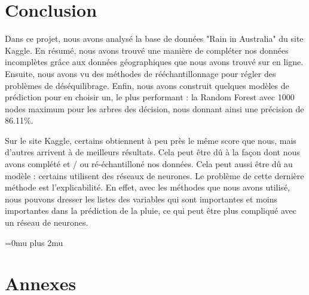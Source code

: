 \documentclass{article}
\begin{document}
\newpage
\part{Conclusion}

Dans ce projet, nous avons analysé la base de données "Rain in Australia" du site Kaggle. En résumé, nous avons trouvé une manière de compléter nos données incomplètes grâce aux données géographiques que nous avons trouvé sur en ligne. Ensuite, nous avons vu des méthodes de rééchantillonnage pour régler des problèmes de déséquilibrage. Enfin, nous avons construit quelques modèles de prédiction pour en choisir un, le plus performant : la Random Forest avec 1000 nodes maximum pour les arbres des décision, nous donnant ainsi une précision de 86.11\%. 

Sur le site Kaggle, certains obtiennent à peu près le même score que nous, mais d'autres arrivent à de meilleurs résultats. Cela peut être dû à la façon dont nous avons complété et / ou ré-échantilloné nos données. Cela peut aussi être dû au modèle : certains utilisent des réseaux de neurones. Le problème de cette dernière méthode est l'explicabilité. En effet, avec les méthodes que nous avons utilisé, nous pouvons dresser les listes des variables qui sont importantes et moins importantes dans la prédiction de la pluie, ce qui peut être plus compliqué avec un réseau de neurones. 

\newpage
\Urlmuskip=0mu plus 2mu
\printbibliography

\newpage
\part{Annexes}
\end{document}
